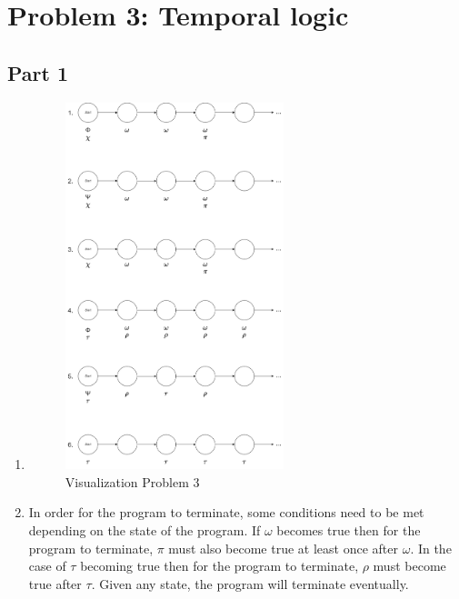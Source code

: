 \documentclass[12pt]{article}
\begin{document}
\section*{Problem 3: Temporal logic}
\subsection*{Part 1}
\begin{enumerate}
	\item \begin{figure}[htbp]
		\centering
		\includegraphics[width=0.60\textwidth]{SOEN331_A1_P311.PNG}
		\caption{Visualization Problem 3}
	\end{figure}
	
	\newpage
	\item In order for the program to terminate, some conditions need to be met depending on the state of the program. If $\omega$ becomes true then for the program to terminate, $\pi$ must also become true at least once after $\omega$. In the case of $\tau$ becoming true then for the program to terminate, $\rho$ must become true after $\tau$. Given any state, the program will terminate eventually.
	 
\end{enumerate}
\end{document}
